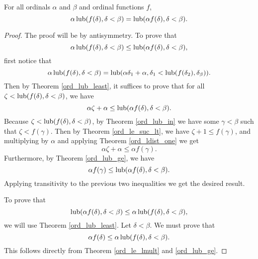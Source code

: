 \documentclass[../../math.tex]{subfiles}
\begin{document}
\begin{theorem} \label{ord_lub_mult}
    For all ordinals $\alpha$ and $\beta$ and ordinal functions $f$,
    \[
        \alpha \operatorname{lub}(f(\delta), \delta < \beta) = \operatorname{lub}(\alpha f(\delta),
        \delta < \beta).
    \]
\end{theorem}
\begin{proof}
    The proof will be by antisymmetry.  To prove that
    \[
        \alpha \operatorname{lub}(f(\delta), \delta < \beta)
        \leq \operatorname{lub}(\alpha f(\delta), \delta < \beta),
    \]
    first notice that
    \[
        \alpha \operatorname{lub}(f(\delta), \delta < \beta)
        = \operatorname{lub}(\alpha \delta_1 + \alpha,
            \delta_1 < \operatorname{lub}(f(\delta_2), \delta_\beta)).
    \]
    Then by Theorem \ref{ord_lub_least}, it suffices to prove that for all
    $\zeta < \operatorname{lub}(f(\delta), \delta < \beta)$, we have
    \[
        \alpha \zeta + \alpha \leq \operatorname{lub}(\alpha f(\delta), \delta < \beta).
    \]
    Because $\zeta < \operatorname{lub}(f(\delta), \delta < \beta)$, by Theorem
    \ref{ord_lub_in} we have some $\gamma < \beta$ such that $\zeta <
    f(\gamma)$.  Then by Theorem \ref{ord_le_suc_lt}, we have $\zeta + 1 \leq
    f(\gamma)$, and multiplying by $\alpha$ and applying Theorem
    \ref{ord_ldist_one} we get
    \[
        \alpha \zeta + \alpha \leq \alpha f(\gamma).
    \]
    Furthermore, by Theorem \ref{ord_lub_ge}, we have
    \[
        \alpha f(\gamma) \leq \operatorname{lub}(\alpha f(\delta), \delta < \beta).
    \]
    Applying transitivity to the previous two inequalities we get the desired
    result.

    To prove that
    \[
        \operatorname{lub}(\alpha f(\delta), \delta < \beta)
        \leq \alpha \operatorname{lub}(f(\delta), \delta < \beta),
    \]
    we will use Theorem \ref{ord_lub_least}.  Let $\delta < \beta$.  We must
    prove that
    \[
        \alpha f(\delta) \leq \alpha \operatorname{lub}(f(\delta), \delta < \beta).
    \]
    This follows directly from Theorem \ref{ord_le_lmult} and \ref{ord_lub_ge}.
\end{proof}
\end{document}
